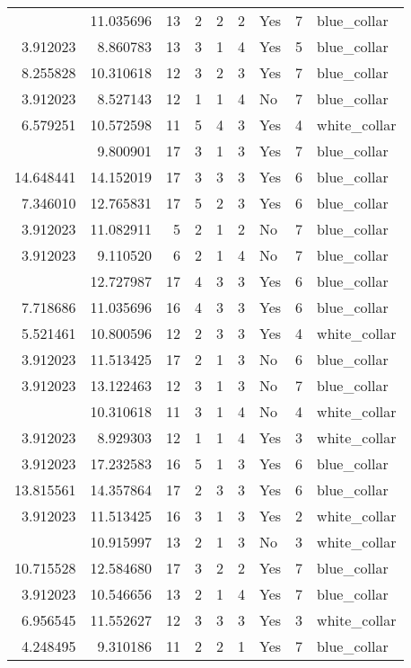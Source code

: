 \documentclass[
]{article}
\begin{document}
\begin{longtable}[t]{rrrrrllrl}
\addlinespace
7.625595 & 11.035696 & 13 & 2 & 2 & 2 & Yes & 7 & blue\_collar\\
3.912023 & 8.860783 & 13 & 3 & 1 & 4 & Yes & 5 & blue\_collar\\
8.255828 & 10.310618 & 12 & 3 & 2 & 3 & Yes & 7 & blue\_collar\\
3.912023 & 8.527143 & 12 & 1 & 1 & 4 & No & 7 & blue\_collar\\
6.579251 & 10.572598 & 11 & 5 & 4 & 3 & Yes & 4 & white\_collar\\
\addlinespace
3.912023 & 9.800901 & 17 & 3 & 1 & 3 & Yes & 7 & blue\_collar\\
14.648441 & 14.152019 & 17 & 3 & 3 & 3 & Yes & 6 & blue\_collar\\
7.346010 & 12.765831 & 17 & 5 & 2 & 3 & Yes & 6 & blue\_collar\\
3.912023 & 11.082911 & 5 & 2 & 1 & 2 & No & 7 & blue\_collar\\
3.912023 & 9.110520 & 6 & 2 & 1 & 4 & No & 7 & blue\_collar\\
\addlinespace
13.997874 & 12.727987 & 17 & 4 & 3 & 3 & Yes & 6 & blue\_collar\\
7.718686 & 11.035696 & 16 & 4 & 3 & 3 & Yes & 6 & blue\_collar\\
5.521461 & 10.800596 & 12 & 2 & 3 & 3 & Yes & 4 & white\_collar\\
3.912023 & 11.513425 & 17 & 2 & 1 & 3 & No & 6 & blue\_collar\\
3.912023 & 13.122463 & 12 & 3 & 1 & 3 & No & 7 & blue\_collar\\
\addlinespace
3.912023 & 10.310618 & 11 & 3 & 1 & 4 & No & 4 & white\_collar\\
3.912023 & 8.929303 & 12 & 1 & 1 & 4 & Yes & 3 & white\_collar\\
3.912023 & 17.232583 & 16 & 5 & 1 & 3 & Yes & 6 & blue\_collar\\
13.815561 & 14.357864 & 17 & 2 & 3 & 3 & Yes & 6 & blue\_collar\\
3.912023 & 11.513425 & 16 & 3 & 1 & 3 & Yes & 2 & white\_collar\\
\addlinespace
3.912023 & 10.915997 & 13 & 2 & 1 & 3 & No & 3 & white\_collar\\
10.715528 & 12.584680 & 17 & 3 & 2 & 2 & Yes & 7 & blue\_collar\\
3.912023 & 10.546656 & 13 & 2 & 1 & 4 & Yes & 7 & blue\_collar\\
6.956545 & 11.552627 & 12 & 3 & 3 & 3 & Yes & 3 & white\_collar\\
4.248495 & 9.310186 & 11 & 2 & 2 & 1 & Yes & 7 & blue\_collar\\

\end{longtable}
\end{document}
